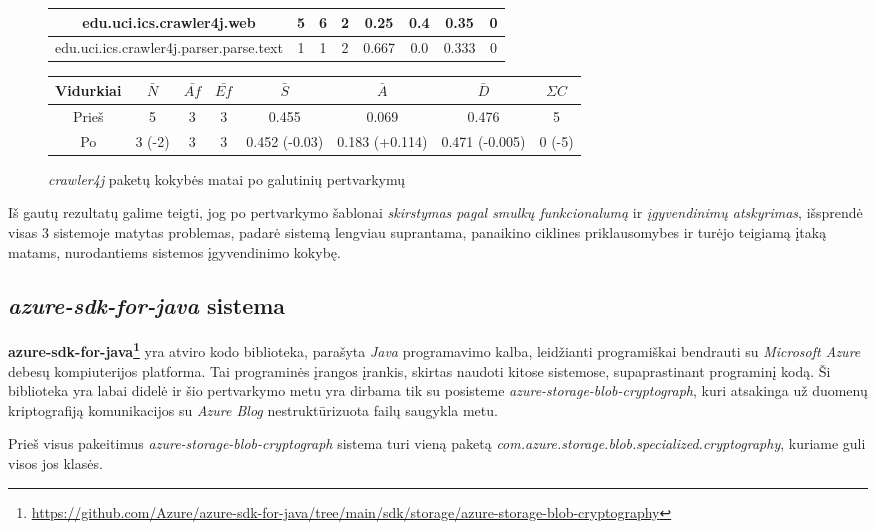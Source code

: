 \begin{figure}[H]
\begin{center}
\begin{tabular}{|c|c|c|c|c|c|c|c|}
        \hline
        edu.uci.ics.crawler4j.web & 5 & 6 & 2 & 0.25 & 0.4 & 0.35 & 0 \\
        \hline
        edu.uci.ics.crawler4j.parser.parse.text & 1 & 1 & 2 & 0.667 & 0.0 & 0.333 & 0 \\
        \hline
    \end{tabular}
    \begin{tabular}{|c|c|c|c|c|c|c|c|}
        \hline
        Vidurkiai & $\bar{N}$ & $\bar{Af}$ & $\bar{Ef}$ & $\bar{S}$ & $\bar{A}$ & $\bar{D}$ & $\Sigma C$ \\ [0.5ex]
        \hline\hline
        Prieš & 5 & 3 & 3 & 0.455 & 0.069 & 0.476 & 5\\
        \hline
        Po & \cellcolor{green!25} 3 (-2) & 3 & 3 & \cellcolor{green!24} 0.452 (-0.03) & \cellcolor{green!25} 0.183 (+0.114) & \cellcolor{green!25} 0.471 (-0.005) & \cellcolor{green!25} 0 (-5)\\
        \hline
    \end{tabular}
\end{center}
\caption{\textit{crawler4j} paketų kokybės matai po galutinių pertvarkymų}
\label{table:abstrs}
\end{figure}
Iš gautų rezultatų galime teigti, jog po pertvarkymo šablonai \textit{skirstymas pagal smulkų funkcionalumą} ir \textit{įgyvendinimų atskyrimas}, išsprendė visas 3 sistemoje matytas problemas,
padarė sistemą lengviau suprantama, panaikino ciklines priklausomybes ir turėjo teigiamą įtaką matams, nurodantiems
sistemos įgyvendinimo kokybę.


\subsection{\textit{azure-sdk-for-java} sistema}
\textbf{azure-sdk-for-java\footnote{\url{https://github.com/Azure/azure-sdk-for-java/tree/main/sdk/storage/azure-storage-blob-cryptography}}} yra atviro kodo
biblioteka, parašyta \textit{Java} programavimo kalba, leidžianti programiškai bendrauti su \textit{Microsoft Azure} debesų kompiuterijos platforma.
Tai programinės įrangos įrankis, skirtas naudoti kitose sistemose, supaprastinant programinį kodą.
Ši biblioteka yra labai didelė ir šio pertvarkymo metu yra dirbama tik su posisteme \textit{azure-storage-blob-cryptograph}, kuri atsakinga už duomenų kriptografiją
komunikacijos su \textit{Azure Blog} nestruktūrizuota failų saugykla metu.

Prieš visus pakeitimus \textit{azure-storage-blob-cryptograph} sistema turi vieną paketą \textit{com.azure.storage.blob.specialized.cryptography}, kuriame guli visos jos klasės.

